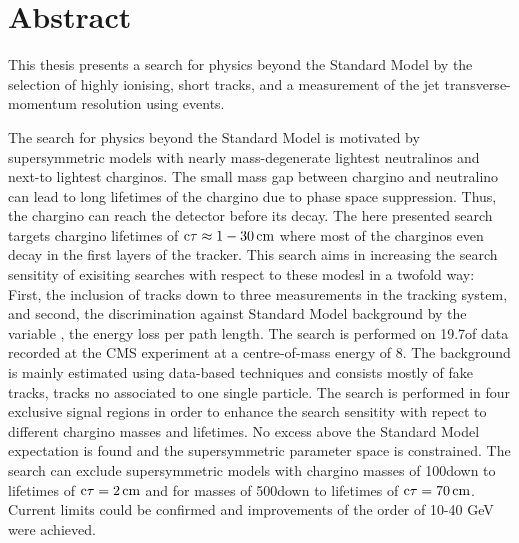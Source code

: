 \chapter*{Abstract}

This thesis presents a search for physics beyond the Standard Model by the selection of highly ionising, short tracks, and a measurement of the jet transverse-momentum resolution using \GAMJET events. 

The search for physics beyond the Standard Model is motivated by supersymmetric models with nearly mass-degenerate lightest neutralinos and next-to lightest charginos.
The small mass gap between chargino and neutralino can lead to long lifetimes of the chargino due to phase space suppression.
Thus, the chargino can reach the detector before its decay.
The here presented search targets chargino lifetimes of $\text{c}\tau \approx 1 - 30\,\text{cm} $ where most of the charginos even decay in the first layers of the tracker. 
This search aims in increasing the search sensitity of exisiting searches with respect to these modesl in a twofold way: First, the inclusion of tracks down to three measurements in the tracking system, and second, the discrimination against Standard Model background by the variable \dedx, the energy loss per path length.
The search is performed on 19.7\fbinv of data recorded at the CMS experiment at a centre-of-mass energy of 8\tev.
The background is mainly estimated using data-based techniques and consists mostly of fake tracks, \ie tracks no associated to one single particle.
The search is performed in four exclusive signal regions in order to enhance the search sensitity with repect to different chargino masses and lifetimes.
No excess above the Standard Model expectation is found and the supersymmetric parameter space is constrained.
The search can exclude supersymmetric models with chargino masses of 100\gev down to lifetimes of $\text{c}\tau=2\,\text{cm}$ and for masses of 500\gev down to lifetimes of $\text{c}\tau=70\,\text{cm}$.
Current limits could be confirmed and improvements of the order of 10-40 GeV were achieved.

